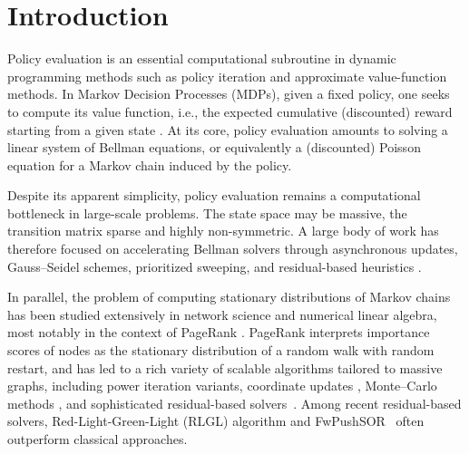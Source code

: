 \documentclass[letterpaper, 10 pt, conference]{ieeeconf}
\begin{document}
\section{Introduction}

Policy evaluation is an essential computational subroutine in dynamic programming methods such as policy iteration and approximate value-function methods. 
In Markov Decision Processes (MDPs), given a fixed policy, one seeks to compute its value function, i.e., the expected cumulative (discounted) reward starting from a given state \cite{puterman2014markov}.  
At its core, policy evaluation amounts to solving a linear system of Bellman equations, or equivalently a (discounted) Poisson equation for a Markov chain induced by the policy.

Despite its apparent simplicity, policy evaluation remains a computational bottleneck in large-scale problems.
The state space may be massive, the transition matrix sparse and highly non-symmetric.
A large body of work has therefore focused on accelerating Bellman solvers through asynchronous updates, Gauss--Seidel schemes, prioritized sweeping, and residual-based heuristics \cite{bertsekas1995generic,puterman2014markov,moore1993prioritized,andre1997generalized,kolobov2012planning}.


In parallel, the problem of computing stationary distributions of Markov chains has been studied extensively in network science and numerical linear algebra, most notably in the context of PageRank \cite{brin1998anatomy}.  
PageRank interprets importance scores of nodes as the stationary distribution of a random walk with random restart, and has led to a rich variety of scalable algorithms tailored to massive graphs, including power iteration variants, coordinate updates \cite{OPIC, mcsherry}, Monte--Carlo methods \cite{avrachenkov2007monte}, and sophisticated residual-based solvers~\cite{fan_chung}.  
Among recent residual-based solvers, Red-Light-Green-Light (RLGL) algorithm \cite{RLGL, RLGL_VAR} and {\sc FwPushSOR}~\cite{chen2023accelerating} often outperform classical approaches. 
\end{document}
